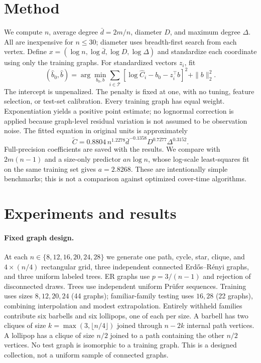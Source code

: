 \documentclass{article}
\begin{document}
\section{Method}
We compute $n$, average degree $\bar d=2m/n$, diameter $D$, and maximum degree $\Delta$. All are inexpensive for $n\leq30$; diameter uses breadth-first search from each vertex. Define $x=(\log n,\log\bar d,\log D,\log\Delta)$ and standardize each coordinate using only the training graphs. For standardized vectors $z_i$, fit
\begin{equation}
 (\hat b_0,\hat b)=\arg\min_{b_0,b}\sum_{i\in\mathcal T}
 [\log\widehat C_i-b_0-z_i^\top b]^2+\|b\|_2^2.
 \label{eq:fit}
\end{equation}
The intercept is unpenalized. The penalty is fixed at one, with no tuning, feature selection, or test-set calibration. Every training graph has equal weight. Exponentiation yields a positive point estimate; no lognormal correction is applied because graph-level residual variation is not assumed to be observation noise. The fitted equation in original units is approximately
\begin{equation}
 \widetilde C=0.8804\,n^{1.2278}\bar d^{-0.1358}D^{0.7277}\Delta^{0.3152}.
 \label{eq:model}
\end{equation}
Full-precision coefficients are saved with the results. We compare with $2m(n-1)$ and a size-only predictor $a n\log n$, whose log-scale least-squares fit on the same training set gives $a=2.8268$. These are intentionally simple benchmarks; this is not a comparison against optimized cover-time algorithms.

\section{Experiments and results}
\paragraph{Fixed graph design.}
At each $n\in\{8,12,16,20,24,28\}$ we generate one path, cycle, star, clique, and $4\times(n/4)$ rectangular grid, three independent connected Erd\H{o}s--R\'enyi graphs, and three uniform labeled trees. ER graphs use $p=3/(n-1)$ and rejection of disconnected draws. Trees use independent uniform Pr\"ufer sequences. Training uses sizes $8,12,20,24$ (44 graphs); familiar-family testing uses $16,28$ (22 graphs), combining interpolation and modest extrapolation. Entirely withheld families contribute six barbells and six lollipops, one of each per size. A barbell has two cliques of size $k=\max(3,\lfloor n/4\rfloor)$ joined through $n-2k$ internal path vertices. A lollipop has a clique of size $n/2$ joined to a path containing the other $n/2$ vertices. No test graph is isomorphic to a training graph. This is a designed collection, not a uniform sample of connected graphs.
\end{document}
